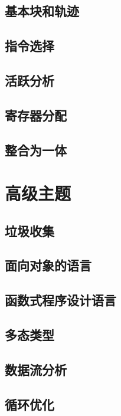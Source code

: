 \documentclass[cn,11pt,chinese]{elegantbook}
\begin{document}
\chapter{基本块和轨迹}

\chapter{指令选择}

\chapter{活跃分析}

\chapter{寄存器分配}

\chapter{整合为一体}

\part{高级主题}

\chapter{垃圾收集}

\chapter{面向对象的语言}

\chapter{函数式程序设计语言}

\chapter{多态类型}

\chapter{数据流分析}

\chapter{循环优化}
\end{document}
